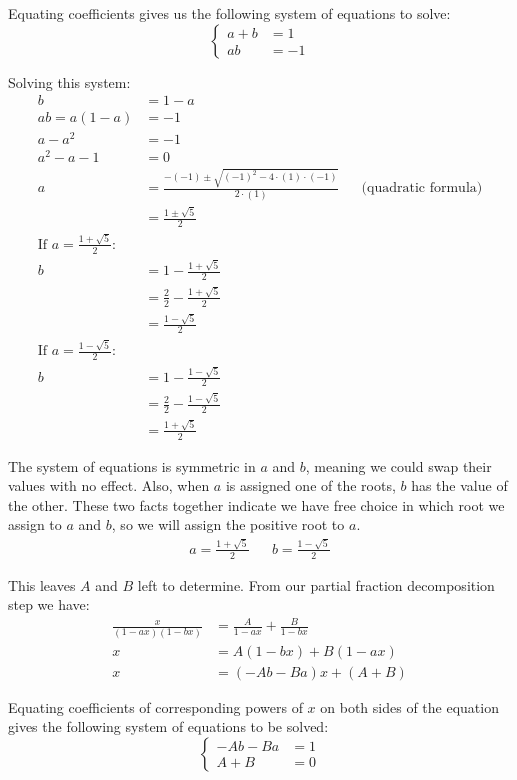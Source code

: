 \documentclass{article}
\begin{document}
Equating coefficients gives us the following system of equations to solve:
\[\begin{cases}
    a+b &= 1 \\
    ab &= -1
\end{cases}\]

Solving this system:
\[\begin{aligned}
    b &= 1-a \\
    ab = a(1-a) &= -1 \\
    a - a^2 &= -1 \\
    a^2-a-1 &= 0 \\
    a &= \frac{-(-1) \pm \sqrt{(-1)^2-4\cdot(1)\cdot(-1)}}{2\cdot(1)}
        && \text{(quadratic formula)} \\
    &= \frac{1 \pm \sqrt5}{2} \\
    \text{If } a = \frac{1 + \sqrt5}{2} \text{:} \\
    b &= 1 - \frac{1 + \sqrt5}{2} \\
    &= \frac{2}{2} - \frac{1 + \sqrt5}{2} \\
    &= \frac{1 - \sqrt5}{2} \\
    \text{If } a = \frac{1 - \sqrt5}{2} \text{:} \\
    b &= 1 - \frac{1 - \sqrt5}{2} \\
    &= \frac{2}{2} - \frac{1 - \sqrt5}{2} \\
    &= \frac{1 + \sqrt5}{2}
\end{aligned}\]

The system of equations is symmetric in \(a\) and \(b\), meaning we could swap
their values with no effect. Also, when \(a\) is assigned one of the roots,
\(b\) has the value of the other. These two facts together indicate we have free
choice in which root we assign to \(a\) and \(b\), so we will assign the
positive root to \(a\).
\[\begin{aligned}
    a = \frac{1 + \sqrt5}{2}
    && b = \frac{1 - \sqrt5}{2}
\end{aligned}\]

This leaves \(A\) and \(B\) left to determine. From our partial fraction
decomposition step we have:
\[\begin{aligned}
    \frac{x}{(1-ax)(1-bx)} &= \frac{A}{1-ax} + \frac{B}{1-bx} \\
    x &= A(1-bx) + B(1-ax) \\
    x &= (-Ab-Ba)x + (A+B)
\end{aligned}\]

Equating coefficients of corresponding powers of \(x\) on both sides of the
equation gives the following system of equations to be solved:
\[ \begin{cases} -Ab-Ba &= 1 \\ A+B &= 0 \end{cases} \]
\end{document}
